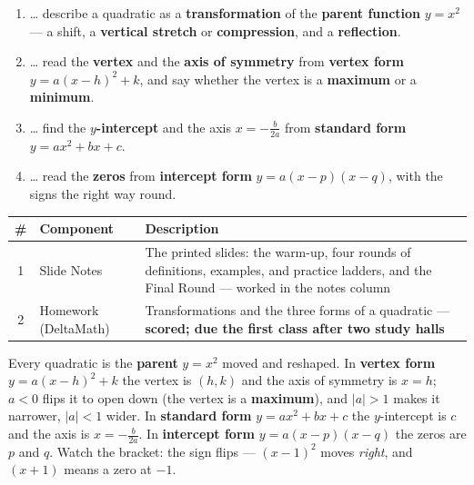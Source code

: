 \documentclass[12pt]{article}
\begin{document}

\namedateperiod
\vspace{0.18in}

\boxguard[14]
\begin{learningtargetbox}
\small
\begin{enumerate}[leftmargin=1.5em, itemsep=5pt]
  \item \ldots{} describe a quadratic as a \textbf{transformation} of the \textbf{parent
        function} $y=x^2$ --- a shift, a \textbf{vertical stretch} or \textbf{compression}, and a
        \textbf{reflection}.
  \item \ldots{} read the \textbf{vertex} and the \textbf{axis of symmetry} from \textbf{vertex
        form} $y=a(x-h)^2+k$, and say whether the vertex is a \textbf{maximum} or a
        \textbf{minimum}.
  \item \ldots{} find the \textbf{$y$-intercept} and the axis $x=-\frac{b}{2a}$ from
        \textbf{standard form} $y=ax^2+bx+c$.
  \item \ldots{} read the \textbf{zeros} from \textbf{intercept form} $y=a(x-p)(x-q)$, with the
        signs the right way round.
\end{enumerate}
\end{learningtargetbox}

\vspace{0.14in}

\boxguard[14]
\begin{tocbox}
\small
\renewcommand{\arraystretch}{1.5}
\begin{tabularx}{\linewidth}{@{} c l X @{}}
\rowcolor{forestbg}
\textbf{\#} & \textbf{Component} & \textbf{Description} \\
\midrule
1 & Slide Notes & The printed slides: the warm-up, four rounds of definitions, examples, and
                  practice ladders, and the Final Round --- worked in the notes column \\
2 & Homework (DeltaMath) & Transformations and the three forms of a quadratic ---
                  \textbf{scored; due the first class after two study halls} \\
\end{tabularx}
\end{tocbox}

\vspace{0.14in}

\boxguard[8]
\begin{remindbox}
\small
Every quadratic is the \textbf{parent} $y=x^2$ moved and reshaped. In \textbf{vertex form}
$y=a(x-h)^2+k$ the vertex is $(h,k)$ and the axis of symmetry is $x=h$; $a<0$ flips it to open
down (the vertex is a \textbf{maximum}), and $|a|>1$ makes it narrower, $|a|<1$ wider. In
\textbf{standard form} $y=ax^2+bx+c$ the $y$-intercept is $c$ and the axis is $x=-\frac{b}{2a}$.
In \textbf{intercept form} $y=a(x-p)(x-q)$ the zeros are $p$ and $q$. Watch the bracket: the
sign flips --- $(x-1)^2$ moves \emph{right}, and $(x+1)$ means a zero at $-1$.
\end{remindbox}
\end{document}
